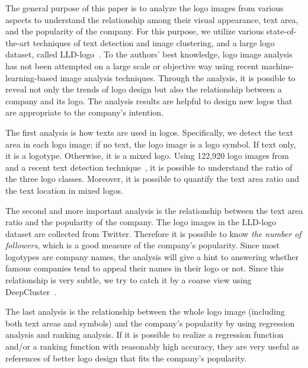 \documentclass[runningheads]{llncs}
\begin{document}
The general purpose of this paper is to analyze the logo images from various aspects to understand the relationship among their visual appearance, text area, and the popularity of the company. For this purpose, we utilize various state-of-the-art techniques of text detection and image clustering, and a large logo dataset, called LLD-logo~\cite{Sage:2018}. 
To the authors' best knowledge, logo image analysis has not been attempted on a large scale or objective way using recent machine-learning-based image analysis techniques. Through the analysis, it is possible to reveal not only the trends of logo design but also the relationship between a company and its logo. The analysis results are helpful to design new logos that are appropriate to the company's intention.\par
%
The first analysis is how texts are used in logos. Specifically, we detect the text area in each logo image; if no text, the logo image is a logo symbol. If text only, it is a logotype. Otherwise, it is a mixed logo. Using 122,920 logo images from \cite{Sage:2018} and a recent text detection technique~\cite{baek2019character}, it is possible to understand the ratio of the three logo classes. Moreover, it is possible to quantify the text area ratio and the text location in mixed logos.\par
%
The second and more important analysis is the relationship between the text area ratio and the popularity of the company. The logo images in the LLD-logo dataset are collected from Twitter. Therefore it is possible to know {\em the number of followers}, which is a good measure of the company's popularity. Since most logotypes are company names, the analysis will give a hint to answering whether famous companies tend to appeal their names in their logo or not. Since this relationship is very subtle, we try to catch it by a coarse view using DeepCluster~\cite{Caron2018deepcluster}.
\par
The last analysis is the relationship between the whole logo image (including both text areas and symbols) and the company's popularity by using regression analysis and ranking analysis. If it is possible to realize a regression function and/or a ranking function with reasonably high accuracy, they are very useful as references of better logo design that fits the company's popularity. 
\end{document}
